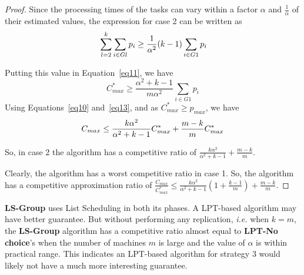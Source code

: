 \documentclass[10pt, conference, compsocconf]{IEEEtran}
\newtheorem{corollary}{Corollary}[theorem]
\begin{document}
\begin{proof}
  Since the processing times of the tasks can vary within a factor
  $\alpha$ and $\frac{1}{\alpha}$ of their estimated values, the
  expression for case 2 can be written as
  \begin{equation}{\nonumber}
    \sum_{l=2}^{k}\sum_{i \in Gl }^{}{ p_{i}} \geq \frac{1}{\alpha^2} (k-1)\sum_{i \in G1 }^{}{ p_{i}}
  \end{equation}
  
  Putting this value in Equation~\ref{eq11}, we have
  \begin{equation}\label{eq13}
    C_{max}^{*} \geq \frac{\alpha^2+k-1}{m\alpha^2}\sum_{i \in G1 }^{}{ p_{i}}
  \end{equation}
  Using Equations~\ref{eq10} and~\ref{eq13}, and as $C_{max}^{*} \geq p_{max}$, we have
  \begin{equation}{\nonumber}
    C_{max} \leq \frac{k\alpha^2}{\alpha^2+k-1}C_{max}^{*}+\frac{m-k}{m}C_{max}^{*}
  \end{equation}
  
  So, in case 2 the algorithm has a competitive ratio of
  $\frac{k\alpha^2}{\alpha^2+k-1}+\frac{m-k}{m}$.

  Clearly, the algorithm has a worst competitive ratio in case 1.  So,
  the algorithm has a competitive approximation ratio of
  $\frac{C_{max}}{C_{max}^{*}} \leq \frac{k\alpha^{2}}{\alpha^{2}+k-1}
  \left( 1+ {\frac{k-1}{m}} \right) + {\frac{m-k}{m}}$.
\end{proof}


\textbf{LS-Group} uses List Scheduling in both its phases. A LPT-based
algorithm may have better guarantee. But without performing any
replication, {\em i.e.} when $k=m$, the \textbf{LS-Group} algorithm
has a competitive ratio almost equal to \textbf{LPT-No choice}'s when
the number of machines $m$ is large and the value of $\alpha$ is
within practical range. This indicates an LPT-based algorithm for
strategy 3 would likely not have a much more interesting guarantee.
\end{document}
